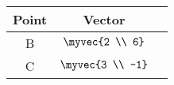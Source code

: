 \begin{tabular}[12pt]{ |c| c| c|} 
    \hline
    {Point} & {Vector} \\ 
    \hline
    B & $ \myvec{2 \\ 6} $  \\
    \hline
    C & $ \myvec{3 \\ -1} $   \\
    \hline  
    \end{tabular}
